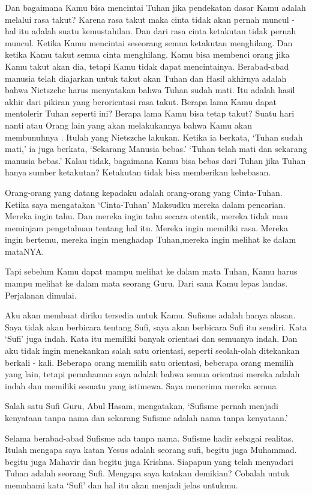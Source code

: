 Dan bagaimana Kamu bisa mencintai Tuhan jika pendekatan dasar Kamu adalah melalui rasa takut? Karena rasa takut maka cinta tidak akan pernah muncul - hal itu adalah suatu kemustahilan. Dan dari rasa cinta ketakutan tidak pernah muncul. Ketika Kamu mencintai seseorang semua ketakutan menghilang.
Dan ketika Kamu takut semua cinta menghilang. Kamu bisa membenci orang jika Kamu takut akan dia,
tetapi Kamu tidak dapat mencintainya. Berabad-abad manusia telah diajarkan untuk takut akan Tuhan dan
Hasil akhirnya adalah bahwa Nietszche harus menyatakan bahwa Tuhan sudah mati. Itu adalah hasil akhir dari
pikiran yang berorientasi rasa takut. Berapa lama Kamu dapat mentolerir Tuhan seperti ini? Berapa lama Kamu bisa tetap takut? Suatu hari nanti atau Orang lain yang akan melakukannya bahwa Kamu akan membunuhnya . Itulah yang Nietszche lakukan. Ketika ia berkata, ‘Tuhan sudah mati,’ ia juga berkata, ‘Sekarang Manusia bebas.’ ‘Tuhan telah mati dan sekarang manusia bebas.’ Kalau tidak, bagaimana Kamu bisa bebas dari Tuhan
jika Tuhan hanya sumber ketakutan? Ketakutan tidak bisa memberikan kebebasan.

Orang-orang yang datang kepadaku adalah orang-orang yang Cinta-Tuhan. Ketika saya mengatakan ‘Cinta-Tuhan’
Maksudku mereka dalam pencarian. Mereka ingin tahu. Dan mereka ingin tahu secara otentik, mereka tidak mau meminjam pengetahuan tentang hal itu. Mereka ingin memiliki rasa. Mereka ingin bertemu, mereka ingin menghadap Tuhan,mereka ingin melihat ke dalam mataNYA.

Tapi sebelum Kamu dapat mampu melihat ke dalam mata Tuhan, Kamu harus mampu melihat ke dalam mata seorang Guru. Dari sana Kamu lepas landas. Perjalanan dimulai.

Aku akan membuat diriku tersedia untuk Kamu. Sufisme adalah hanya alasan. Saya tidak akan berbicara tentang Sufi, saya akan berbicara Sufi itu sendiri. Kata ‘Sufi’ juga indah. Kata itu memiliki banyak orientasi dan semuanya indah. Dan aku tidak ingin menekankan salah satu orientasi, seperti seolah-olah ditekankan berkali - kali. Beberapa orang memilih satu orientasi, beberapa orang memilih yang lain, tetapi pemahaman saya adalah bahwa semua orientasi mereka adalah indah dan memiliki sesuatu yang istimewa. Saya menerima mereka semua

Salah satu Sufi Guru, Abul Hasam, mengatakan, ‘Sufisme pernah menjadi kenyataan tanpa nama dan sekarang Sufisme adalah nama tanpa kenyataan.’

Selama berabad-abad Sufisme ada tanpa nama. Sufisme hadir sebagai realitas. Itulah mengapa saya katan Yesus adalah seorang sufi, begitu juga Muhammad. begitu juga Mahavir dan begitu juga Krishna. Siapapun yang telah menyadari Tuhan adalah seorang Sufi. Mengapa saya katakan demikian? Cobalah untuk memahami kata ‘Sufi’ dan hal itu akan menjadi jelas untukmu.

